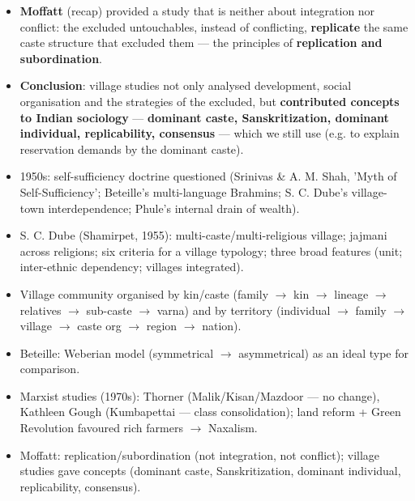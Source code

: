 \begin{KeyConcept}
\begin{itemize}
\item \textbf{Moffatt} (recap) provided a study that is neither about integration nor conflict: the excluded untouchables, instead of conflicting, \textbf{replicate} the same caste structure that excluded them --- the principles of \textbf{replication and subordination}.
\item \textbf{Conclusion}: village studies not only analysed development, social organisation and the strategies of the excluded, but \textbf{contributed concepts to Indian sociology} --- \textbf{dominant caste, Sanskritization, dominant individual, replicability, consensus} --- which we still use (e.g. to explain reservation demands by the dominant caste).
\end{itemize}
\end{KeyConcept}

\begin{QuickRevision}
\begin{itemize}
\item 1950s: self-sufficiency doctrine questioned (Srinivas \& A. M. Shah, 'Myth of Self-Sufficiency'; Beteille's multi-language Brahmins; S. C. Dube's village-town interdependence; Phule's internal drain of wealth).
\item S. C. Dube (Shamirpet, 1955): multi-caste/multi-religious village; jajmani across religions; six criteria for a village typology; three broad features (unit; inter-ethnic dependency; villages integrated).
\item Village community organised by kin/caste (family $\rightarrow$ kin $\rightarrow$ lineage $\rightarrow$ relatives $\rightarrow$ sub-caste $\rightarrow$ varna) and by territory (individual $\rightarrow$ family $\rightarrow$ village $\rightarrow$ caste org $\rightarrow$ region $\rightarrow$ nation).
\item Beteille: Weberian model (symmetrical $\rightarrow$ asymmetrical) as an ideal type for comparison.
\item Marxist studies (1970s): Thorner (Malik/Kisan/Mazdoor --- no change), Kathleen Gough (Kumbapettai --- class consolidation); land reform + Green Revolution favoured rich farmers $\rightarrow$ Naxalism.
\item Moffatt: replication/subordination (not integration, not conflict); village studies gave concepts (dominant caste, Sanskritization, dominant individual, replicability, consensus).
\end{itemize}
\end{QuickRevision}

